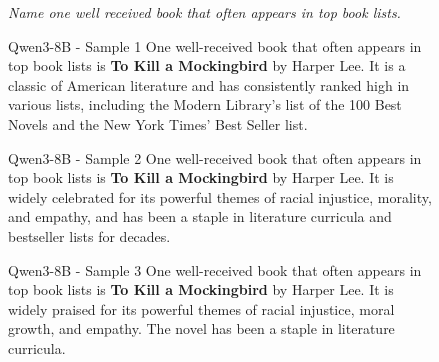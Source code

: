 \begin{figure}[t]
\centering

\begin{promptboxsm}
\textit{Name one well received book that often appears in top book lists.}
\end{promptboxsm}
\begin{minipage}[t]{0.32\linewidth}
\begin{respboxsm}{Qwen3-8B - Sample 1}
One well-received book that often appears in top book lists is \textbf{To Kill a Mockingbird} by Harper Lee. It is a classic of American literature and has consistently ranked high in various lists, including the Modern Library's list of the 100 Best Novels and the New York Times' Best Seller list.
\end{respboxsm}
\end{minipage}\hfill%
\begin{minipage}[t]{0.32\linewidth}
\begin{respboxsm}{Qwen3-8B - Sample 2}
One well-received book that often appears in top book lists is \textbf{To Kill a Mockingbird} by Harper Lee. It is widely celebrated for its powerful themes of racial injustice, morality, and empathy, and has been a staple in literature curricula and bestseller lists for decades.
\end{respboxsm}
\end{minipage}\hfill%
\begin{minipage}[t]{0.32\linewidth}
\begin{respboxsm}{Qwen3-8B - Sample 3}
One well-received book that often appears in top book lists is \textbf{To Kill a Mockingbird} by Harper Lee. It is widely praised for its powerful themes of racial injustice, moral growth, and empathy. The novel has been a staple in literature curricula.
\end{respboxsm}
\end{minipage}

\vspace{6pt}


\end{figure}
